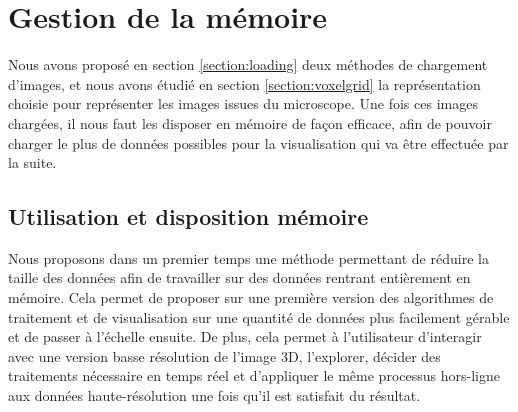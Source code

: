 {	%
	\section{Gestion de la mémoire}\label{section:memory}
	{

		Nous avons proposé en section \ref{section:loading} deux méthodes de chargement d'images, et nous avons étudié en section \ref{section:voxelgrid} la représentation choisie pour représenter les images issues du microscope. Une fois ces images chargées, il nous faut les disposer en mémoire de façon efficace, afin de pouvoir charger le plus de données possibles pour la visualisation qui va être effectuée par la suite.

		\subsection{Utilisation et disposition mémoire}
		{
    
            Nous proposons dans un premier temps une méthode permettant de réduire la taille des données afin de travailler sur des données rentrant entièrement en mémoire. Cela permet de proposer sur une première version des algorithmes de traitement et de visualisation sur une quantité de données plus facilement gérable et de passer à l'échelle ensuite. De plus, cela permet à l'utilisateur d'interagir avec une version basse résolution de l'image 3D, l'explorer, décider des traitements nécessaire en temps réel et d'appliquer le même processus hors-ligne aux données haute-résolution une fois qu'il est satisfait du résultat. 
            
}}}
